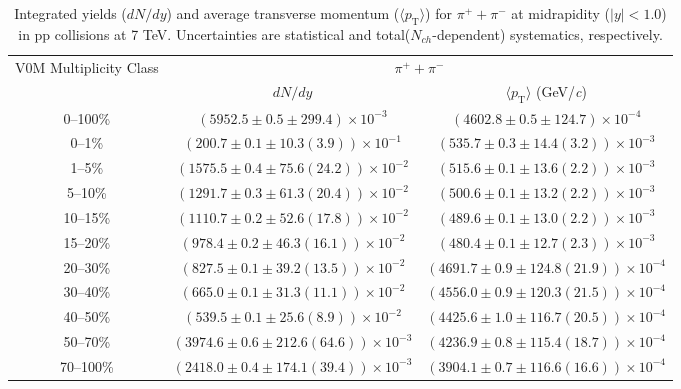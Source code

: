
 
\begin{table}
\caption{Integrated yields ($dN/dy$) and average transverse momentum ($\langle p_{\mathrm{T}} \rangle$) for $\pi^{+} + \pi^{-}$ at midrapidity ($|y|<1.0$) in pp collisions at 7 TeV. Uncertainties are statistical and total($N_{ch}$-dependent) systematics, respectively.}
\label{tab:YieldMeanPionSum_}
\begin{center}
\begin{tabular}{ c | c c }
\hline
\multirow{2}{*}{V0M Multiplicity Class} & \multicolumn{2}{c}{$\pi^{+} + \pi^{-}$} \\ 
& $dN/dy$ & $\langle p_{\mathrm{T}} \rangle$ (GeV/\textit{c})\\ 
\hline
0--100\% & $(5952.5\pm0.5\pm299.4)\times10^{-3}$ & $(4602.8\pm0.5\pm124.7)\times10^{-4}$ \\ 
0--1\% & $(200.7\pm0.1\pm10.3(3.9))\times10^{-1}$ & $(535.7\pm0.3\pm14.4(3.2))\times10^{-3}$ \\ 
1--5\% & $(1575.5\pm0.4\pm75.6(24.2))\times10^{-2}$ & $(515.6\pm0.1\pm13.6(2.2))\times10^{-3}$ \\ 
5--10\% & $(1291.7\pm0.3\pm61.3(20.4))\times10^{-2}$ & $(500.6\pm0.1\pm13.2(2.2))\times10^{-3}$ \\ 
10--15\% & $(1110.7\pm0.2\pm52.6(17.8))\times10^{-2}$ & $(489.6\pm0.1\pm13.0(2.2))\times10^{-3}$ \\ 
15--20\% & $(978.4\pm0.2\pm46.3(16.1))\times10^{-2}$ & $(480.4\pm0.1\pm12.7(2.3))\times10^{-3}$ \\ 
20--30\% & $(827.5\pm0.1\pm39.2(13.5))\times10^{-2}$ & $(4691.7\pm0.9\pm124.8(21.9))\times10^{-4}$ \\ 
30--40\% & $(665.0\pm0.1\pm31.3(11.1))\times10^{-2}$ & $(4556.0\pm0.9\pm120.3(21.5))\times10^{-4}$ \\ 
40--50\% & $(539.5\pm0.1\pm25.6(8.9))\times10^{-2}$ & $(4425.6\pm1.0\pm116.7(20.5))\times10^{-4}$ \\ 
50--70\% & $(3974.6\pm0.6\pm212.6(64.6))\times10^{-3}$ & $(4236.9\pm0.8\pm115.4(18.7))\times10^{-4}$ \\ 
70--100\% & $(2418.0\pm0.4\pm174.1(39.4))\times10^{-3}$ & $(3904.1\pm0.7\pm116.6(16.6))\times10^{-4}$ \\ 
\hline
\end{tabular}
\end{center}
\end{table}
 

